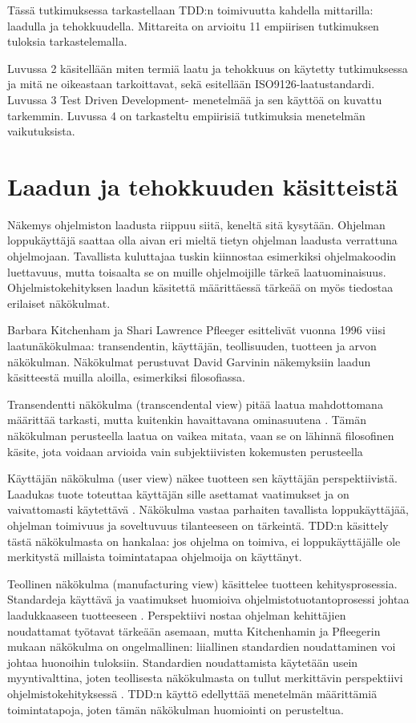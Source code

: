 \documentclass[finnish]{tktltiki2}
\theoremstyle{definition}
\theoremstyle{remark}
\begin{document}
Tässä tutkimuksessa tarkastellaan TDD:n toimivuutta kahdella mittarilla: laadulla ja tehokkuudella. Mittareita on arvioitu 11 empiirisen tutkimuksen tuloksia tarkastelemalla.

Luvussa 2 käsitellään miten termiä laatu ja tehokkuus on käytetty tutkimuksessa ja mitä ne oikeastaan tarkoittavat, sekä esitellään ISO9126-laatustandardi. Luvussa 3 Test Driven Development- menetelmää ja sen käyttöä on kuvattu tarkemmin. Luvussa 4 on tarkasteltu empiirisiä tutkimuksia menetelmän vaikutuksista.


\section{Laadun ja tehokkuuden käsitteistä}

Näkemys ohjelmiston laadusta riippuu siitä, keneltä sitä kysytään. Ohjelman loppukäyttäjä saattaa olla aivan eri mieltä tietyn ohjelman laadusta verrattuna ohjelmojaan. Tavallista kuluttajaa tuskin kiinnostaa esimerkiksi ohjelmakoodin luettavuus, mutta toisaalta se on muille ohjelmoijille tärkeä laatuominaisuus. Ohjelmistokehityksen laadun käsitettä määrittäessä tärkeää on myös tiedostaa erilaiset näkökulmat.

Barbara Kitchenham ja Shari Lawrence Pfleeger \cite{Kitchenham96} esittelivät vuonna 1996 viisi laatunäkökulmaa: transendentin, käyttäjän, teollisuuden, tuotteen ja arvon näkökulman. Näkökulmat perustuvat David Garvinin näkemyksiin laadun käsitteestä muilla aloilla, esimerkiksi filosofiassa.

Transendentti näkökulma (transcendental view) pitää laatua mahdottomana määrittää tarkasti, mutta kuitenkin havaittavana ominasuutena \cite{Kitchenham96}. Tämän näkökulman perusteella laatua on vaikea mitata, vaan se on lähinnä filosofinen käsite, jota voidaan arvioida vain subjektiivisten kokemusten perusteella

Käyttäjän näkökulma (user view) näkee tuotteen sen käyttäjän perspektiivistä. Laadukas tuote toteuttaa käyttäjän sille asettamat vaatimukset ja on vaivattomasti käytettävä \cite{Kitchenham96}. Näkökulma vastaa parhaiten tavallista loppukäyttäjää, ohjelman toimivuus ja soveltuvuus tilanteeseen on tärkeintä. TDD:n käsittely tästä näkökulmasta on hankalaa: jos ohjelma on toimiva, ei loppukäyttäjälle ole merkitystä millaista toimintatapaa ohjelmoija on käyttänyt.

Teollinen näkökulma (manufacturing view) käsittelee tuotteen kehitysprosessia. Standardeja käyttävä ja vaatimukset huomioiva ohjelmistotuotantoprosessi johtaa laadukkaaseen tuotteeseen \cite{Kitchenham96}. Perspektiivi nostaa ohjelman kehittäjien noudattamat työtavat tärkeään asemaan, mutta Kitchenhamin ja Pfleegerin mukaan näkökulma on ongelmallinen: liiallinen standardien noudattaminen voi johtaa huonoihin tuloksiin. Standardien noudattamista käytetään usein myyntivalttina, joten teollisesta näkökulmasta on tullut merkittävin perspektiivi ohjelmistokehityksessä \cite{Cote07}. TDD:n käyttö edellyttää menetelmän määrittämiä toimintatapoja, joten tämän näkökulman huomiointi on perusteltua. 
\end{document}
